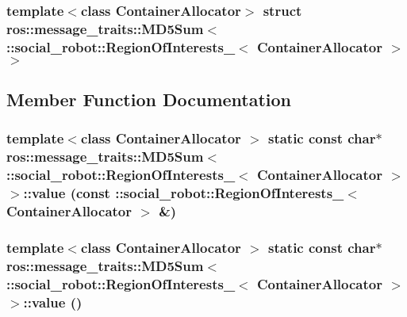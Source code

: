 \subsubsection*{template$<$class ContainerAllocator$>$ struct ros::message\_\-traits::MD5Sum$<$ ::social\_\-robot::RegionOfInterests\_\-$<$ ContainerAllocator $>$ $>$}



\subsection{Member Function Documentation}
\hypertarget{structros_1_1message__traits_1_1MD5Sum_3_01_1_1social__robot_1_1RegionOfInterests___3_01ContainerAllocator_01_4_01_4_a0250fe5254b1e1c56322d0de2ba977dc}{
\subsubsection[{value}]{\setlength{\rightskip}{0pt plus 5cm}template$<$class ContainerAllocator $>$ static const char$\ast$ ros::message\_\-traits::MD5Sum$<$ ::{\bf social\_\-robot::RegionOfInterests\_\-}$<$ ContainerAllocator $>$ $>$::value (const ::{\bf social\_\-robot::RegionOfInterests\_\-}$<$ ContainerAllocator $>$ \&)}}
\label{structros_1_1message__traits_1_1MD5Sum_3_01_1_1social__robot_1_1RegionOfInterests___3_01ContainerAllocator_01_4_01_4_a0250fe5254b1e1c56322d0de2ba977dc}
\hypertarget{structros_1_1message__traits_1_1MD5Sum_3_01_1_1social__robot_1_1RegionOfInterests___3_01ContainerAllocator_01_4_01_4_a67994b4181cbea5a65fb049951814fa6}{
\subsubsection[{value}]{\setlength{\rightskip}{0pt plus 5cm}template$<$class ContainerAllocator $>$ static const char$\ast$ ros::message\_\-traits::MD5Sum$<$ ::{\bf social\_\-robot::RegionOfInterests\_\-}$<$ ContainerAllocator $>$ $>$::value ()}}
\label{structros_1_1message__traits_1_1MD5Sum_3_01_1_1social__robot_1_1RegionOfInterests___3_01ContainerAllocator_01_4_01_4_a67994b4181cbea5a65fb049951814fa6}


